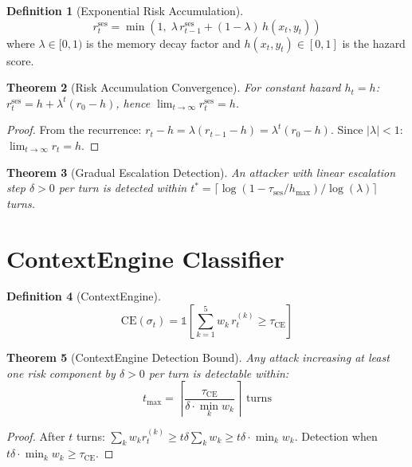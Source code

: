 \documentclass[12pt,a4paper]{report}
\theoremstyle{plain}
\newtheorem{theorem}{Theorem}[chapter]
\theoremstyle{definition}
\newtheorem{definition}[theorem]{Definition}
\theoremstyle{remark}
\newcommand{\ind}{\mathbb{1}}
\begin{document}
\begin{definition}[Exponential Risk Accumulation]
\label{def:risk-accum}
\begin{equation}
    r_t^{\text{ses}} = \min\!\left(1,\;
    \lambda\, r_{t-1}^{\text{ses}}
    + (1-\lambda)\, h(x_t, y_t)\right)
\end{equation}
where $\lambda \in [0,1)$ is the memory decay factor
and $h(x_t, y_t) \in [0,1]$ is the hazard score.
\end{definition}

\begin{theorem}[Risk Accumulation Convergence]
\label{thm:risk-conv}
For constant hazard $h_t = h$:
$r_t^{\text{ses}} = h + \lambda^t(r_0 - h)$,
hence $\lim_{t \to \infty} r_t^{\text{ses}} = h$.
\end{theorem}
\begin{proof}
From the recurrence:
$r_t - h = \lambda(r_{t-1} - h) = \lambda^t(r_0 - h)$.
Since $|\lambda| < 1$: $\lim_{t\to\infty} r_t = h$.
\end{proof}

\begin{theorem}[Gradual Escalation Detection]
\label{thm:escalation}
An attacker with linear escalation step $\delta > 0$
per turn is detected within
$t^* = \lceil \log(1 - \tau_{\text{ses}}/h_{\max})
/ \log(\lambda) \rceil$ turns.
\end{theorem}

\section{ContextEngine Classifier}

\begin{definition}[ContextEngine]
\label{def:ce}
\begin{equation}
    \text{CE}(\sigma_t) = \ind\!\left[
    \sum_{k=1}^{5} w_k\, r_t^{(k)} \geq \tau_{\text{CE}}
    \right]
\end{equation}
\end{definition}

\begin{theorem}[ContextEngine Detection Bound]
\label{thm:ce-bound}
Any attack increasing at least one risk component by
$\delta > 0$ per turn is detectable within:
\begin{equation}
    t_{\max} = \left\lceil
    \frac{\tau_{\text{CE}}}{\delta \cdot \min_k w_k}
    \right\rceil \text{ turns}
\end{equation}
\end{theorem}
\begin{proof}
After $t$ turns:
$\sum_k w_k r_t^{(k)} \geq t\delta \sum_k w_k
\geq t\delta \cdot \min_k w_k$.
Detection when $t\delta \cdot \min_k w_k \geq \tau_{\text{CE}}$.
\end{proof}
\end{document}
